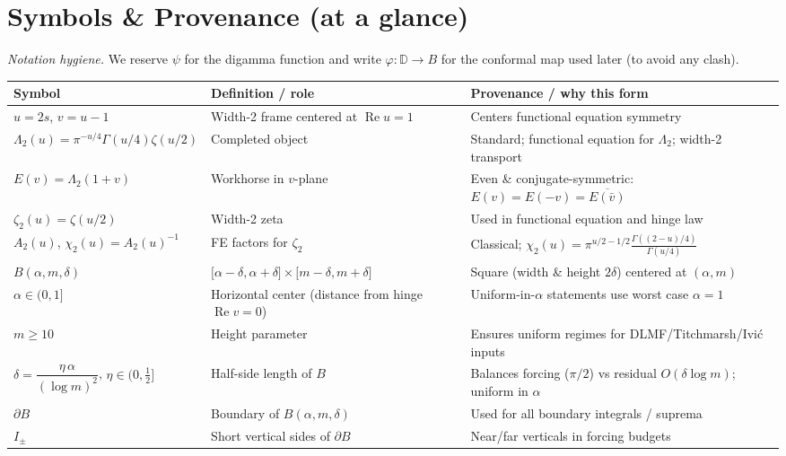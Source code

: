 \documentclass[11pt]{article}
\numberwithin{equation}{section}
\theoremstyle{remark}
\newcommand{\D}{\mathbb{D}}
\DeclareMathOperator{\Real}{Re}
\newcommand{\LamTwo}{\Lambda_2}
\newcommand{\chiTwo}{\chi_2}
\begin{document}
\section*{Symbols \& Provenance (at a glance)}\label{sec:symbols}

\noindent\textit{Notation hygiene.} We reserve $\psi$ for the digamma function and write $\varphi:\D\to B$ for the conformal map used later (to avoid any clash).

\medskip
\begin{tabularx}{\textwidth}{@{}p{3.2cm} L L@{}}
\toprule
\textbf{Symbol} & \textbf{Definition / role} & \textbf{Provenance / why this form}\\
\midrule
$u=2s$, $v=u-1$ & Width-2 frame centered at $\Real u=1$ & Centers functional equation symmetry\\[2pt]
$\LamTwo(u)=\pi^{-u/4}\Gamma(u/4)\zeta(u/2)$ & Completed object & Standard; functional equation for $\LamTwo$; width-2 transport\\[2pt]
$E(v)=\LamTwo(1+v)$ & Workhorse in $v$-plane & Even \& conjugate-symmetric: $E(v)=E(-v)=\overline{E(\bar v)}$\\[2pt]
$\zeta_2(u)=\zeta(u/2)$ & Width-2 zeta & Used in functional equation and hinge law\\[2pt]
$A_2(u)$, $\chiTwo(u)=A_2(u)^{-1}$ & FE factors for $\zeta_2$ & Classical; $\chiTwo(u)=\pi^{u/2-1/2}\frac{\Gamma((2-u)/4)}{\Gamma(u/4)}$\\[2pt]
$B(\alpha,m,\delta)$ & $\big[\alpha-\delta,\alpha+\delta\big]\times\big[m-\delta,m+\delta\big]$ & Square (width \& height $2\delta$) centered at $(\alpha,m)$\\[2pt]
$\alpha\in(0,1]$ & Horizontal center (distance from hinge $\Real v=0$) & Uniform-in-$\alpha$ statements use worst case $\alpha=1$\\[2pt]
$m\ge 10$ & Height parameter & Ensures uniform regimes for DLMF/Titchmarsh/Ivi\'c inputs\\[2pt]
$\delta=\dfrac{\eta\,\alpha}{(\log m)^2}$, $\eta\in(0,\tfrac12]$ & Half-side length of $B$ & Balances forcing ($\pi/2$) vs residual $O(\delta\log m)$; uniform in $\alpha$\\[4pt]
$\partial B$ & Boundary of $B(\alpha,m,\delta)$ & Used for all boundary integrals / suprema\\[2pt]
$I_\pm$ & Short vertical sides of $\partial B$ & Near/far verticals in forcing budgets\\[2pt]

\end{tabularx}
\end{document}
